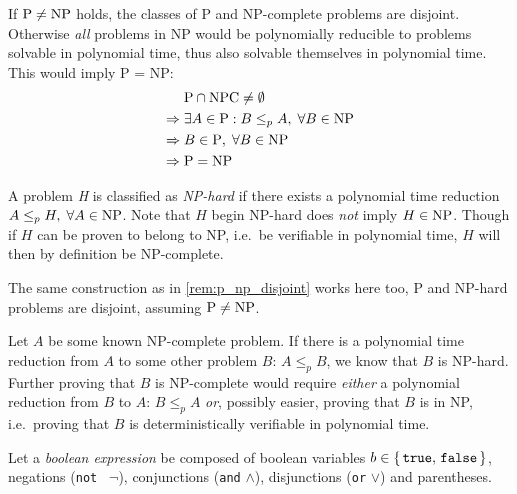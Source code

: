 \begin{remark}\label{rem:p_np_disjoint}
	If \(\text{P} \neq \text{NP}\) holds, the classes of P and NP-complete problems are disjoint. Otherwise \emph{all} problems in NP would be polynomially reducible to problems solvable in polynomial time, thus also solvable themselves in polynomial time. This would imply P = NP:
	\begin{align*}
		& \text{P} \cap \text{NPC} \neq \emptyset \\
		\Rightarrow \; & \exists A \in \text{P} : B \leq_p A, \; \forall B \in \text{NP} \\
		\Rightarrow \; & B \in \text{P}, \; \forall B \in \text{NP} \\
		\Rightarrow \; & \text{P} = \text{NP}
	\end{align*}
\end{remark}

\begin{definition}\label{def:np_hard}
	A problem \emph{H} is classified as \emph{NP-hard} if there exists a polynomial time reduction \(A \leq_p H, \; \forall A \in \text{NP}\). 
	Note that \(H\) begin NP-hard does \emph{not} imply \(H \in \text{NP}\). 
	Though if \(H\) can be proven to belong to NP, i.e.~be verifiable in polynomial time, \(H\) will then by definition be NP-complete.
\end{definition}

\begin{remark}\label{rem:p_np_hard_disjoint}
	The same construction as in \cref{rem:p_np_disjoint} works here too, P and NP-hard problems are disjoint, assuming \(\text{P} \neq \text{NP}\).
\end{remark}

\begin{remark}\label{note:npc_proving}
	Let \(A\) be some known NP-complete problem. 
	If there is a polynomial time reduction from \(A\) to some other problem \(B\): \(A \leq_p B\), we know that \(B\) is NP-hard. 
	Further proving that \(B\) is NP-complete would require \emph{either} a polynomial reduction from \(B\) to \(A\): \(B \leq_p A\) \emph{or}, possibly easier, proving that \(B\) is in NP, i.e.~proving that \(B\) is deterministically verifiable in polynomial time.
\end{remark}

Let a \emph{boolean expression} be composed of boolean variables \(b \in \set{\texttt{true},\, \texttt{false}}\), negations (\texttt{not } \(\neg\)), conjunctions (\texttt{and} \(\land\)), disjunctions (\texttt{or} \(\lor\)) and parentheses.

